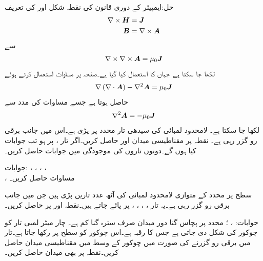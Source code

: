 حل:ایمپیئر کے دوری قانون کی نقطہ شکل اور  کی تعریف
\begin{align*}
\nabla \times {\ensuremath{{\boldsymbol{H}}}}&={{\boldsymbol{J}}}\\
{{\boldsymbol{B}}}&=\nabla \times {\ensuremath{{\boldsymbol{A}}}}
\end{align*}
سے
\begin{align*}
\nabla \times \nabla \times {\ensuremath{{\boldsymbol{A}}}}=\mu_0 {{\boldsymbol{J}}}
\end{align*}
لکھا جا سکتا ہے جہاں  کا استعمال کیا گیا ہے۔صفحہ  پر مساوات  استعمال کرتے ہوئے
\begin{align*}
\nabla \left(\nabla \cdot {\ensuremath{{\boldsymbol{A}}}} \right)-\nabla^2 {{\boldsymbol{A}}}=\mu_0 {{\boldsymbol{J}}}
\end{align*}
حاصل ہوتا ہے جسے مساوات  کی مدد سے
\begin{align}
\nabla^2 {{\boldsymbol{A}}}=-\mu_0 {{\boldsymbol{J}}}
\end{align}
لکھا جا سکتا ہے۔
\newpage
{}
لامحدود لمبائی کی سیدھی تار  محدد پر پڑی ہے۔اس میں  جانب  برقی رو گزر رہی ہے۔ نقطہ  پر مقناطیسی میدان  اور  حاصل کریں۔اگر تار ،  پر ہو تب جوابات کیا ہوں گے۔دونوں تاروں کی موجودگی میں جوابات حاصل کریں۔ 

جوابات: ، ، ، ،\\
 ، 
مساوات  حاصل کریں۔

سطح  پر  محدد کے متوازی لامحدود لمبائی کی آٹھ عدد تاریں پڑی ہیں جن میں  جانب  برقی رو گزر رہی ہے۔یہ تار ، ، ، ،  پر پائے جاتے ہیں۔نقطہ  اور  پر  حاصل کریں۔

جوابات: ، ؛ محدد پر پچاس گنا دور میدان صرف سترہ گنا کم ہے۔
چار میٹر لمبی تار کو چوکور کی شکل دی جاتی ہے جس کا رقبہ  ہے۔اس چوکور کو  سطح پر رکھا جاتا ہے۔تار میں برقی رو  گزرنے کی صورت میں چوکور کے وسط  میں مقناطیسی میدان  حاصل کریں۔نقطہ  پر بھی میدان حاصل کریں۔

